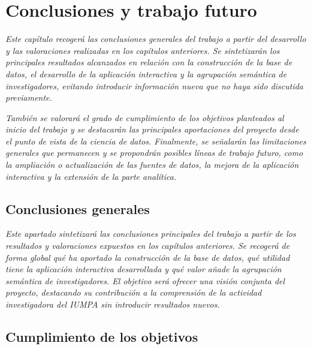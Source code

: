 \documentclass[11pt,spanish,listoffigures,listoftables]{tfgetsinf}
\begin{document}


\chapter{Conclusiones y trabajo futuro}

\textit{Este capítulo recogerá las conclusiones generales del trabajo a partir del desarrollo y las valoraciones realizadas en los capítulos anteriores. Se sintetizarán los principales resultados alcanzados en relación con la construcción de la base de datos, el desarrollo de la aplicación interactiva y la agrupación semántica de investigadores, evitando introducir información nueva que no haya sido discutida previamente.}

\textit{También se valorará el grado de cumplimiento de los objetivos planteados al inicio del trabajo y se destacarán las principales aportaciones del proyecto desde el punto de vista de la ciencia de datos. Finalmente, se señalarán las limitaciones generales que permanecen y se propondrán posibles líneas de trabajo futuro, como la ampliación o actualización de las fuentes de datos, la mejora de la aplicación interactiva y la extensión de la parte analítica.}

\section{Conclusiones generales}

\textit{Este apartado sintetizará las conclusiones principales del trabajo a partir de los resultados y valoraciones expuestos en los capítulos anteriores. Se recogerá de forma global qué ha aportado la construcción de la base de datos, qué utilidad tiene la aplicación interactiva desarrollada y qué valor añade la agrupación semántica de investigadores. El objetivo será ofrecer una visión conjunta del proyecto, destacando su contribución a la comprensión de la actividad investigadora del IUMPA sin introducir resultados nuevos.}

\section{Cumplimiento de los objetivos}
\end{document}
